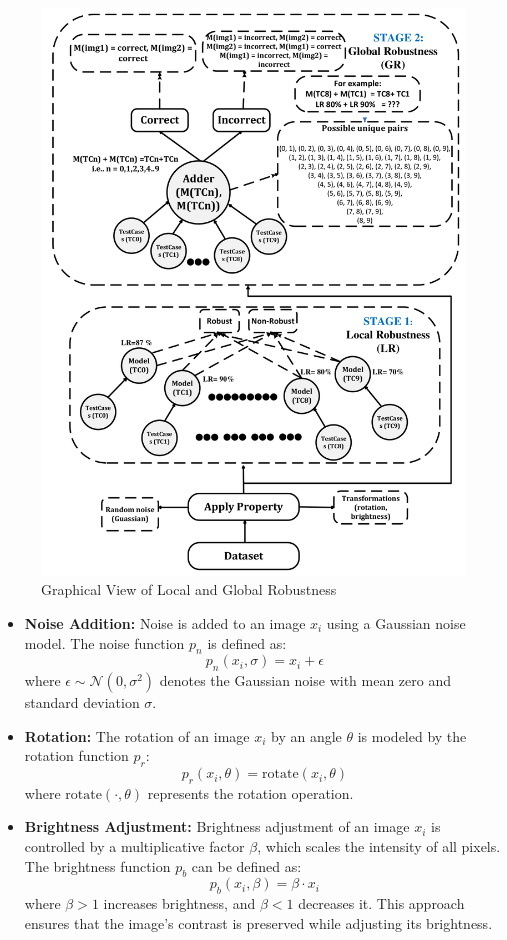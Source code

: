 \documentclass[10pt, conference, a4paper, final]{IEEEtran}
\begin{document}
\begin{figure}{}
    \centering
    \includegraphics[width=\linewidth]{paper_images/step4.pdf}
    \caption{Graphical View of Local and Global Robustness}
    \label{fig:graph}
\end{figure}

\begin{itemize}
    \item \textbf{Noise Addition:} Noise is added to an image \( x_i \) using a Gaussian noise model. The noise function \( p_n \) is defined as:
    \[ p_n(x_i, \sigma) = x_i + \epsilon \]
    where \( \epsilon \sim \mathcal{N}(0, \sigma^2) \) denotes the Gaussian noise with mean zero and standard deviation \(\sigma\).

    \item \textbf{Rotation:} The rotation of an image \( x_i \) by an angle \(\theta\) is modeled by the rotation function \( p_r \):
    \[ p_r(x_i, \theta) = \text{rotate}(x_i, \theta) \]
    where \(\text{rotate}(\cdot, \theta)\) represents the rotation operation.

    \item \textbf{Brightness Adjustment:} Brightness adjustment of an image \( x_i \) is controlled by a multiplicative factor \( \beta \), which scales the intensity of all pixels. The brightness function \( p_b \) can be defined as:
    \[ p_b(x_i, \beta) = \beta \cdot x_i \]
    where \( \beta > 1 \) increases brightness, and \( \beta < 1 \) decreases it. This approach ensures that the image's contrast is preserved while adjusting its brightness.

\end{itemize}
\end{document}
